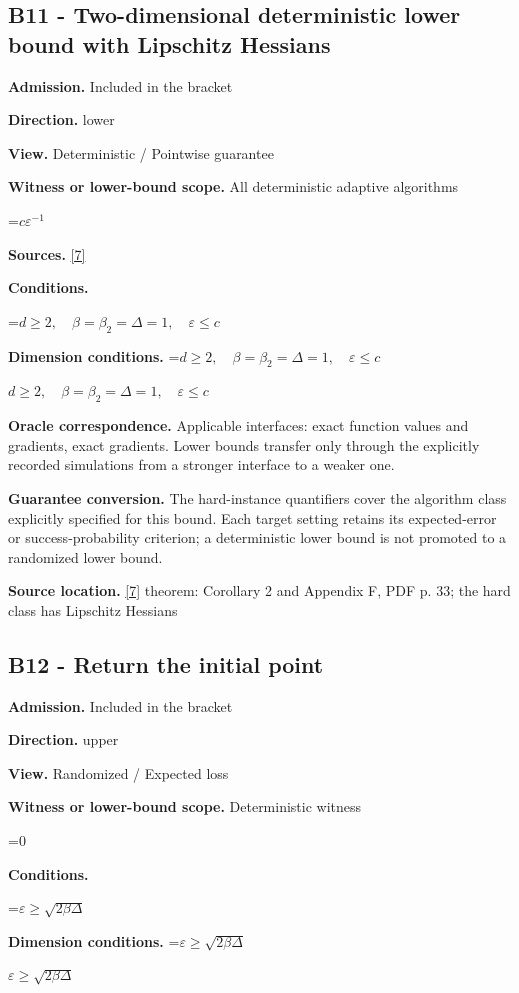 \documentclass[10pt,a4paper]{article}
\newcommand{\AtlasMath}[1]{\par\begingroup\centering\setbox0=\hbox{$\displaystyle #1$}\ifdim\wd0>1.4\linewidth\typeout{ATLAS WIDE FORMULA: \the\wd0}\fi\ifdim\wd0>\linewidth\resizebox{\linewidth}{!}{\box0}\else\box0\fi\par\endgroup}
\newcommand{\AtlasInlineMath}[1]{\begingroup\setbox0=\hbox{$#1$}\ifdim\wd0>.4\linewidth\endgroup\AtlasMath{#1}\else\endgroup$#1$\fi}
\begin{document}
\subsection{B11 - Two-dimensional deterministic lower bound with Lipschitz Hessians}
\textbf{Admission.} Included in the bracket

\textbf{Direction.} lower

\textbf{View.} Deterministic / Pointwise guarantee

\textbf{Witness or lower-bound scope.} All deterministic adaptive algorithms

\AtlasMath{c\varepsilon^{-1}}
\textbf{Sources.} \href{https://proceedings.mlr.press/v235/kontogiannis24a.html}{[7]}

\textbf{Conditions.} 
\AtlasMath{d\ge2,\quad\beta=\beta_2=\Delta=1,\quad\varepsilon\le c}


\textbf{Dimension conditions.} \AtlasInlineMath{d\ge2,\quad\beta=\beta_2=\Delta=1,\quad\varepsilon\le c}

\textbf{Oracle correspondence.} Applicable interfaces: exact function values and gradients, exact gradients. Lower bounds transfer only through the explicitly recorded simulations from a stronger interface to a weaker one.

\textbf{Guarantee conversion.} The hard-instance quantifiers cover the algorithm class explicitly specified for this bound. Each target setting retains its expected-error or success-probability criterion; a deterministic lower bound is not promoted to a randomized lower bound.

\textbf{Source location.} \href{https://proceedings.mlr.press/v235/kontogiannis24a.html}{[7]} theorem: Corollary 2 and Appendix F, PDF p. 33; the hard class has Lipschitz Hessians

\subsection{B12 - Return the initial point}
\textbf{Admission.} Included in the bracket

\textbf{Direction.} upper

\textbf{View.} Randomized / Expected loss

\textbf{Witness or lower-bound scope.} Deterministic witness

\AtlasMath{0}
\textbf{Conditions.} 
\AtlasMath{\varepsilon\ge\sqrt{2\beta\Delta}}


\textbf{Dimension conditions.} \AtlasInlineMath{\varepsilon\ge\sqrt{2\beta\Delta}}
\end{document}
